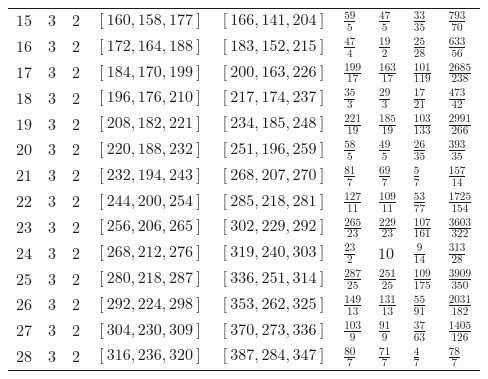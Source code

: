 \documentclass[12pt]{extarticle}
\begin{document}
\begin{longtable}{lllllllll}
$15$ & $3$ & $2$ & $\left[160, 158, 177\right]$ & $\left[166, 141, 204\right]$ & $\frac{59}{5}$ & $\frac{47}{5}$ & $\frac{33}{35}$ & $\frac{793}{70}$ \\
$16$ & $3$ & $2$ & $\left[172, 164, 188\right]$ & $\left[183, 152, 215\right]$ & $\frac{47}{4}$ & $\frac{19}{2}$ & $\frac{25}{28}$ & $\frac{633}{56}$ \\
$17$ & $3$ & $2$ & $\left[184, 170, 199\right]$ & $\left[200, 163, 226\right]$ & $\frac{199}{17}$ & $\frac{163}{17}$ & $\frac{101}{119}$ & $\frac{2685}{238}$ \\
$18$ & $3$ & $2$ & $\left[196, 176, 210\right]$ & $\left[217, 174, 237\right]$ & $\frac{35}{3}$ & $\frac{29}{3}$ & $\frac{17}{21}$ & $\frac{473}{42}$ \\
$19$ & $3$ & $2$ & $\left[208, 182, 221\right]$ & $\left[234, 185, 248\right]$ & $\frac{221}{19}$ & $\frac{185}{19}$ & $\frac{103}{133}$ & $\frac{2991}{266}$ \\
$20$ & $3$ & $2$ & $\left[220, 188, 232\right]$ & $\left[251, 196, 259\right]$ & $\frac{58}{5}$ & $\frac{49}{5}$ & $\frac{26}{35}$ & $\frac{393}{35}$ \\
$21$ & $3$ & $2$ & $\left[232, 194, 243\right]$ & $\left[268, 207, 270\right]$ & $\frac{81}{7}$ & $\frac{69}{7}$ & $\frac{5}{7}$ & $\frac{157}{14}$ \\
$22$ & $3$ & $2$ & $\left[244, 200, 254\right]$ & $\left[285, 218, 281\right]$ & $\frac{127}{11}$ & $\frac{109}{11}$ & $\frac{53}{77}$ & $\frac{1725}{154}$ \\
$23$ & $3$ & $2$ & $\left[256, 206, 265\right]$ & $\left[302, 229, 292\right]$ & $\frac{265}{23}$ & $\frac{229}{23}$ & $\frac{107}{161}$ & $\frac{3603}{322}$ \\
$24$ & $3$ & $2$ & $\left[268, 212, 276\right]$ & $\left[319, 240, 303\right]$ & $\frac{23}{2}$ & $10$ & $\frac{9}{14}$ & $\frac{313}{28}$ \\
$25$ & $3$ & $2$ & $\left[280, 218, 287\right]$ & $\left[336, 251, 314\right]$ & $\frac{287}{25}$ & $\frac{251}{25}$ & $\frac{109}{175}$ & $\frac{3909}{350}$ \\
$26$ & $3$ & $2$ & $\left[292, 224, 298\right]$ & $\left[353, 262, 325\right]$ & $\frac{149}{13}$ & $\frac{131}{13}$ & $\frac{55}{91}$ & $\frac{2031}{182}$ \\
$27$ & $3$ & $2$ & $\left[304, 230, 309\right]$ & $\left[370, 273, 336\right]$ & $\frac{103}{9}$ & $\frac{91}{9}$ & $\frac{37}{63}$ & $\frac{1405}{126}$ \\
$28$ & $3$ & $2$ & $\left[316, 236, 320\right]$ & $\left[387, 284, 347\right]$ & $\frac{80}{7}$ & $\frac{71}{7}$ & $\frac{4}{7}$ & $\frac{78}{7}$ \\

\end{longtable}
\end{document}
